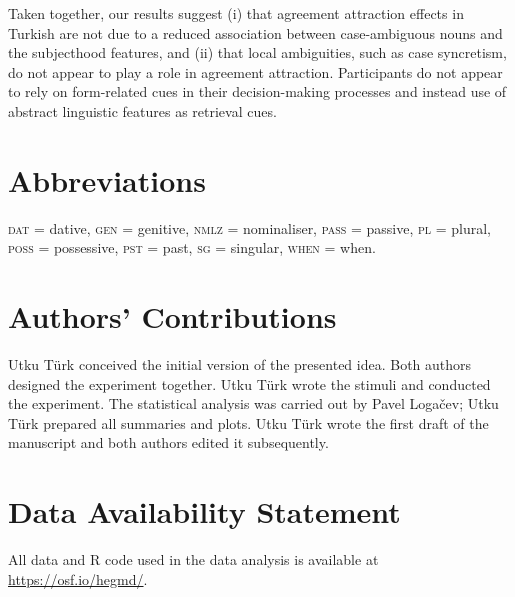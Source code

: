 \documentclass[]{interact}
\theoremstyle{plain}%
\theoremstyle{definition}
\theoremstyle{remark}
\begin{document}
Taken together, our results suggest (i) that agreement attraction effects in Turkish are not due to a reduced association between case-ambiguous nouns and the subjecthood features, and (ii) that local ambiguities, such as case syncretism, do not appear to play a role in agreement attraction. Participants do not appear to rely on form-related cues in their decision-making processes and instead use of abstract linguistic features as retrieval cues.

\section*{Abbreviations} %


\textsc{dat} = dative, \textsc{gen} = genitive, \textsc{nmlz} = nominaliser, \textsc{pass} = passive, \textsc{pl} = plural, \textsc{poss} = possessive, \textsc{pst} = past, \textsc{sg} = singular, \textsc{when} = when. %


\section*{Authors' Contributions} %


Utku T\"urk conceived the initial version of the presented idea. Both authors designed the experiment together. 
Utku T\"urk wrote the stimuli and conducted the experiment. The statistical analysis was carried out by Pavel Loga\v{c}ev; Utku T\"urk prepared all summaries and plots. Utku T\"urk wrote the first draft of the manuscript and both authors edited it subsequently. 

\section*{Data Availability Statement} %

All data and R code used in the data analysis is available at \url{https://osf.io/hegmd/}.





\end{document}
